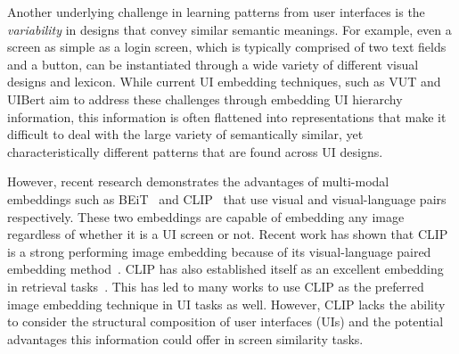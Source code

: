 Another underlying challenge in learning patterns from user interfaces is the \textit{variability} in designs that convey similar semantic meanings. For example, even a screen as simple as a login screen, which is typically comprised of two text fields and a button, can be instantiated through a wide variety of different visual designs and lexicon. While current UI embedding techniques, such as VUT and UIBert aim to address these challenges through embedding UI hierarchy information, this information is often flattened into representations that make it difficult to deal with the large variety of semantically similar, yet characteristically different patterns that are found across UI designs.

However, recent research demonstrates the advantages of multi-modal embeddings such as BEiT~\cite{bao22} and CLIP~\cite{clip} that use visual and visual-language pairs respectively. These two embeddings are capable of embedding any image regardless of whether it is a UI screen or not. Recent work has shown that CLIP is a strong performing image embedding because of its visual-language paired embedding method~\cite{wei23, Che23, Alpay23, Yu23}. CLIP has also established itself as an excellent embedding in retrieval tasks~\cite{Alpay23, Radford21, Li22}. This has led to many works to use CLIP as the preferred image embedding technique in UI tasks as well. However, CLIP lacks the ability to consider the structural composition of user interfaces (UIs) and the potential advantages this information could offer in screen similarity tasks.

